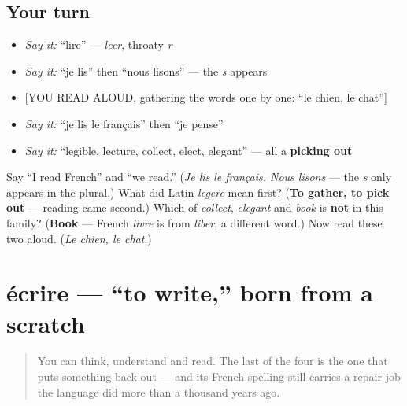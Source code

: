\subsection*{Your turn}
\begin{itemize}
\raggedright
  \item \emph{Say it:} \textquotedblleft{}lire\textquotedblright{} — \emph{leer}, throaty \emph{r}
  \item \emph{Say it:} \textquotedblleft{}je lis\textquotedblright{} then \textquotedblleft{}nous lisons\textquotedblright{} — the \emph{s} appears
  \item {[}YOU READ ALOUD, gathering the words one by one: \textquotedblleft{}le chien, le chat\textquotedblright{}{]}
  \item \emph{Say it:} \textquotedblleft{}je lis le français\textquotedblright{} then \textquotedblleft{}je pense\textquotedblright{}
  \item \emph{Say it:} \textquotedblleft{}legible, lecture, collect, elect, elegant\textquotedblright{} — all a \textbf{picking out}
\end{itemize}

\begin{tcolorbox}[breakable,colback=teal!4,colframe=teal!35!black,title={Before you move on}]
Say \textquotedblleft{}I read French\textquotedblright{} and \textquotedblleft{}we read.\textquotedblright{} (\emph{Je lis le français. Nous lisons} — the \emph{s} only appears in the plural.) What did Latin \emph{legere} mean first? (\textbf{To gather, to pick out} — reading came second.) Which of \emph{collect}, \emph{elegant} and \emph{book} is \textbf{not} in this family? (\textbf{Book} — French \emph{livre} is from \emph{liber}, a different word.) Now read these two aloud. (\emph{Le chien, le chat}.)
\end{tcolorbox}
\section[écrire]{écrire — \textquotedblleft{}to write,\textquotedblright{} born from a scratch}

\label{lesson:FR-C25-ecrire}



\begin{quote}
You can think, understand and read. The last of the four is the one that puts something back out — and its French spelling still carries a repair job the language did more than a thousand years ago.
\end{quote}

